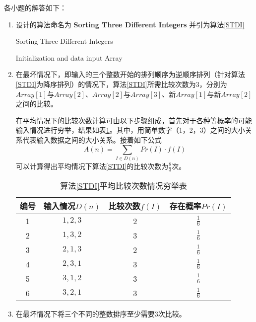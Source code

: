 \documentclass[UTF8,12pt]{article} %
\makeatletter
\theoremstyle{definition}
\newenvironment{proof}[1][\protect\proofname]{\par
\normalfont\topsep6\p@\@plus6\p@\relax
\trivlist
\itemindent\parindent
\item[\hskip\labelsep
\scshape
#1]\ignorespaces
}{%
\endtrivlist\@endpefalse
}
\renewcommand{\proofname}{\it{\textbf{证明}}}
\makeatother
\begin{document}
\begin{proof}[\textbf{解答}]
各小题的解答如下：
\begin{enumerate}[1)]
\item 	设计的算法命名为 \textbf{Sorting Three Different Integers} 并引为算法\ref{STDI}
\begin{algorithm}[htb]
    \caption{Sorting Three Different Integers}
    \label{STDI}

	\SetAlgoLined
	Initialization and data input\;
 	\Return Array\;
\end{algorithm}

\item 在最坏情况下，即输入的三个整数开始的排列顺序为逆顺序排列（针对算法\ref{STDI}为降序排列）的情况下，算法\ref{STDI}所需比较次数为3，分别为$Array[1]$与$Array[2]$、$Array[2]$与$Array[3]$、新$Array[1]$与新$Array[2]$之间的比较。

在平均情况下的比较次数计算可由以下步骤组成，首先对于各种等概率的可能输入情况进行穷举，结果如表\ref{tab1}。其中，用简单数字（1，2，3）之间的大小关系代表输入数据之间的大小关系。接着如下公式\[A(n) = \sum_{I \in D(n)}Pr(I)\cdot f(I)\]可以计算得出平均情况下算法\ref{STDI}的比较次数为$\displaystyle\frac{8}{3}$次。
\begin{table}[!htbp]
	\caption{算法\ref{STDI}平均比较次数情况穷举表} \centering
	\label{tab1}
	\begin{tabular}{cccc}
	\toprule[1.5pt]
	编号& 输入情况$D(n)$ & 比较次数$f(I)$ & 存在概率$Pr(I)$\\
	\midrule[1pt]
	1 & $1,2,3$ & 2 & $\displaystyle\frac{1}{6}$\\
	2 & $1,3,2$ & 3 & $\displaystyle\frac{1}{6}$\\
	3 & $2,1,3$ & 2 & $\displaystyle\frac{1}{6}$\\
	4 & $2,3,1$ & 3 & $\displaystyle\frac{1}{6}$\\
	5 & $3,1,2$ & 3 & $\displaystyle\frac{1}{6}$\\
	6 & $3,2,1$ & 3 & $\displaystyle \frac{1}{6}$\\
	\bottomrule[1.5pt]
	\end{tabular}
	\end{table}

\newpage
\item 在最坏情况下将三个不同的整数排序至少需要3次比较。
\end{enumerate}
\end{proof}
\end{document}
